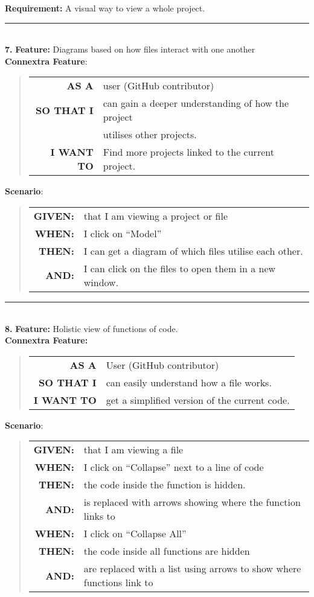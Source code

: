 \documentclass[12pt]{article}
\newcommand{\Requirement}[1] {
   \noindent \textbf{Requirement:} #1
}
\newcommand{\Feature}[1]{ 
   \noindent \textbf{Feature:} #1
}
\newcommand{\CFeature}[4]{
\noindent \textbf{Connextra Feature:}
	\begin{quote}
	\begin{tabular}{rl}
	\textbf{AS A} & #1\\
	\textbf{SO THAT \uppercase{#2}} & #3\\
	\textbf{\uppercase{#2} WANT TO} & #4  
	\end{tabular}
	\end{quote}
}
\newcommand{\GivenSc} {
	\noindent \textbf{GIVEN:}
	}
\newcommand{\WhenSc} {
	\noindent \textbf{WHEN:}
	}
\newcommand{\AndSc} {
	\noindent \textbf{AND:}
	}
\newcommand{\ThenSc} {
	\noindent \textbf{THEN:}
	}
\begin{document}
\pagebreak
\begin{framed}
\Requirement{A visual way to view a whole project.}\\[0.2cm]

\hrule~\\

\noindent\textbf{7.}\Feature{Diagrams based on how files interact with one another}\\[0.2cm]

\noindent \textbf{Connextra Feature}:
\begin{quote}
\begin{tabular}{rl}
\textbf{AS A}      & user (\textsf{GitHub} contributor)\\
\textbf{SO THAT I} & can gain a deeper understanding of how the project\\
                   & utilises other projects.\\
\textbf{I WANT TO} & Find more projects linked to the current project.
\end{tabular}
\end{quote}

\noindent \textbf{Scenario}:
\begin{quote}
\begin{tabular}{rl}
\GivenSc & that I am viewing a project or file\\
\WhenSc & I click on “Model”\\
\ThenSc & I can get a diagram of which files utilise each other.\\
\AndSc & I can click on the files to open them in a new window.
\end{tabular}
\end{quote}

\hrule~\\

\noindent\textbf{8.}\Feature{Holistic view of functions of code.}\\[0.2cm]

\noindent \CFeature{User (\textsf{GitHub} contributor)}{I}{can easily understand how a file works.}{get a simplified version of the current code.}

\noindent \textbf{Scenario}:
\begin{quote}
\begin{tabular}{rl}
\GivenSc & that I am viewing a file\\
\WhenSc & I click on ``Collapse'' next to a line of code\\
\ThenSc & the code inside the function is hidden.\\
\AndSc & is replaced with arrows showing where the function links to\\
\WhenSc & I click on ``Collapse All''\\
\ThenSc & the code inside all functions are hidden\\
\AndSc & are replaced with a list using arrows to show where functions link to
\end{tabular}
\end{quote}
\end{framed}
\end{document}
